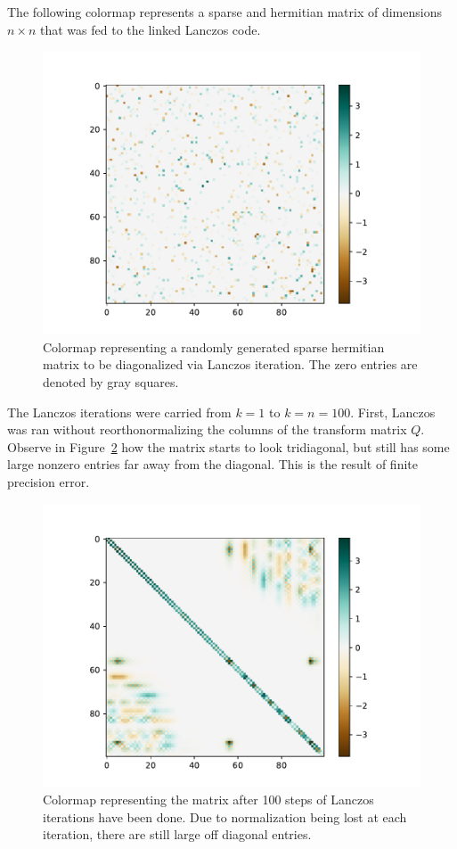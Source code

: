 The following colormap represents a sparse and hermitian matrix of dimensions $n \times n$ that was fed to the linked Lanczos code. 
%
\begin{figure}[ht]
\begin{center}
\includegraphics[width=0.7\columnwidth]{Images/Lanczos/A.pdf}
\end{center}
\caption{Colormap representing a randomly generated sparse hermitian matrix to be diagonalized via Lanczos iteration. The zero entries are denoted by gray squares.}
\label{}
\end{figure}
%
The Lanczos iterations were carried from $k=1$ to $k=n=100$. First, Lanczos was ran without reorthonormalizing the columns of the transform matrix $Q$. Observe in Figure~\ref{fig:almostTriDiag} how the matrix starts to look tridiagonal, but still has some large nonzero entries far away from the diagonal. This is the result of finite precision error.
%
\begin{figure}[h!]
\begin{center}
\includegraphics[width=0.7\columnwidth]{Images/Lanczos/T_noReortho.pdf}
\end{center}
\caption{Colormap representing the matrix after 100 steps of Lanczos iterations have been done. Due to normalization being lost at each iteration, there are still large off diagonal entries.}
\label{fig:almostTriDiag}
\end{figure}
